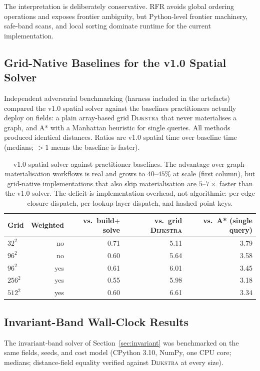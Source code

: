 \documentclass[11pt]{article}
\newcommand{\RFR}{\textsc{RFR}}
\newcommand{\Dijkstra}{\textsc{Dijkstra}}
\begin{document}
The interpretation is deliberately conservative. \RFR{} avoids global ordering operations and exposes frontier ambiguity, but Python-level frontier machinery, safe-band scans, and local sorting dominate runtime for the current implementation.

\subsection{Grid-Native Baselines for the v1.0 Spatial Solver}
\label{sec:gridnative}

Independent adversarial benchmarking (harness included in the artefacts) compared the v1.0 spatial solver against the baselines practitioners actually deploy on fields: a plain array-based grid \Dijkstra{} that never materialises a graph, and A* with a Manhattan heuristic for single queries. All methods produced identical distances. Ratios are v1.0 spatial time over baseline time (medians; $>1$ means the baseline is faster).

\begin{table}[htbp]
\centering
\begin{tabular}{lrrrr}
\toprule
Grid & Weighted & vs.\ build$+$solve & vs.\ grid \Dijkstra{} & vs.\ A* (single query) \\
\midrule
$32^2$  & no  & 0.71 & 5.11 & 3.79 \\
$96^2$  & no  & 0.60 & 5.64 & 3.58 \\
$96^2$  & yes & 0.61 & 6.01 & 3.45 \\
$256^2$ & yes & 0.55 & 5.98 & 3.18 \\
$512^2$ & yes & 0.60 & 6.61 & 3.34 \\
\bottomrule
\end{tabular}
\caption{v1.0 spatial solver against practitioner baselines. The advantage over graph-materialisation workflows is real and grows to $40$--$45\%$ at scale (first column), but grid-native implementations that also skip materialisation are $5$--$7\times$ faster than the v1.0 solver. The deficit is implementation overhead, not algorithmic: per-edge closure dispatch, per-lookup layer dispatch, and hashed point keys.}
\label{tab:gridnative}
\end{table}

\subsection{Invariant-Band Wall-Clock Results}
\label{sec:invariantresults}

The invariant-band solver of Section~\ref{sec:invariant} was benchmarked on the same fields, seeds, and cost model (CPython 3.10, NumPy, one CPU core; medians; distance-field equality verified against \Dijkstra{} at every size).
\end{document}
